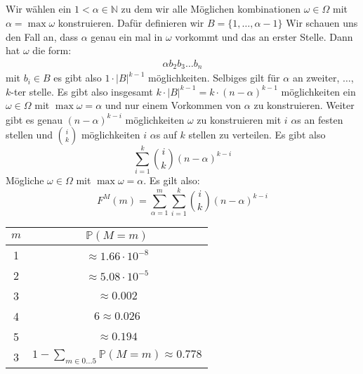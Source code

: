 \documentclass{article}
\newcommand{\N}{\mathbb{N}}
\begin{document}
    \subsection{}
        Wir wählen ein $1<\alpha\in\N$ zu dem wir alle
        Möglichen kombinationen $\omega\in\Omega$ mit
        $\alpha=\max\omega$ konstruieren.
        Dafür definieren wir $B=\{1,\hdots,\alpha-1\}$
        Wir schauen uns den Fall an, dass $\alpha$ genau
        ein mal in $\omega$ vorkommt und das an erster
        Stelle. Dann hat $\omega$ die form:
        \begin{align*}
            \alpha b_2b_3\hdots b_n
        \end{align*}
        mit $b_i\in B$
        es gibt also $1 \cdot |B|^{k-1}$
        möglichkeiten.
        Selbiges gilt für $\alpha$ an zweiter, $\hdots$,
        $k$-ter stelle.
        Es gibt also insgesamt
        $k\cdot |B|^{k-1}=k\cdot (n-\alpha)^{k-1}$
        möglichkeiten ein $\omega\in\Omega$ mit
        $\max\omega=\alpha$ und nur einem Vorkommen von
        $\alpha$ zu konstruieren.
        Weiter gibt es genau
        $(n-\alpha)^{k-i}$ möglichkeiten $\omega$ zu
        konstruieren mit $i$ $\alpha$s an festen stellen
        und ${i\choose{k}}$ möglichkeiten $i$ $\alpha$s
        auf $k$ stellen zu verteilen.
        Es gibt also
        \begin{equation*}
            \sum_{i=1}^{k}{i\choose k}(n-\alpha)^{k-i}
        \end{equation*}
        Mögliche $\omega\in\Omega$ mit $\max\omega=\alpha$.
        Es gilt also:
        \begin{equation*}
            F^M(m)=\sum_{\alpha=1}^{m}
            \sum_{i=1}^{k}{i\choose k}(n-\alpha)^{k-i}
        \end{equation*}
        \begin{tabular}{c|c}
            \textbf{$m$}&\textbf{$\mathbb P(M=m)$}\\
            \hline
            1&$\approx 1.66\cdot 10^{-8}$\\
            2&$\approx 5.08\cdot 10^{-5}$\\
            3&$\approx 0.002$\\
            4&$6\approx 0.026$\\
            5&$\approx 0.194$\\
            3&$1-\sum_{m\in 0\hdots 5}\mathbb P(M=m)\approx 0.778$
        \end{tabular}\\
\end{document}
